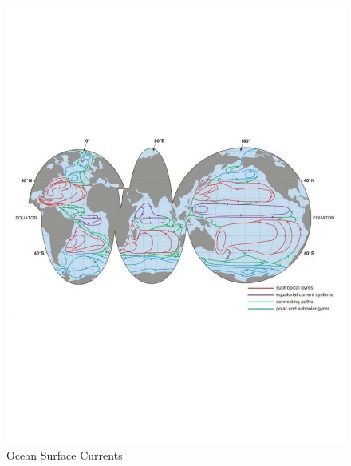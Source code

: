 \begin{figure}%
  \begin{center}
    \includegraphics[scale=0.7]{Figures/WindDrivenCurrents.pdf}%
    \caption{Ocean Surface Currents \cite{Haidvogel1999}}
    \label{fig:Currents}
  \end{center}
\end{figure}

